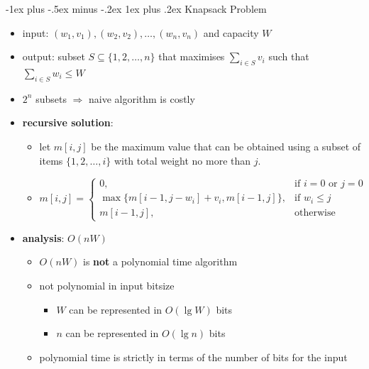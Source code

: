 \documentclass[10pt,landscape]{article}
\makeatletter
\renewcommand{\subsubsection}{\@startsection{subsubsection}{3}{0mm}%
                                {-1ex plus -.5ex minus -.2ex}%
                                {1ex plus .2ex}%
                                {\normalfont\small\bfseries}}
\newcommand{\1}{\mathmybb{1}}
\makeatother
\begin{document}
\begin{multicols*}{3}
\subsubsection{Knapsack Problem}
\begin{itemize}[topsep=0pt,noitemsep,wide=0pt, leftmargin=\dimexpr{} + 2\relax]
  \item input: $(w_1, v_1), (w_2, v_2), \dots, (w_n, v_n) $ and capacity $W$
  \item output: subset $S \subseteq \{ 1, 2, \dots, n \}$ that maximises $\sum_{i \in S}v_i$ such that $\sum_{i \in S} w_i \leq W$
\end{itemize}

\begin{itemize}[topsep=0pt,noitemsep,wide=0pt, leftmargin=\dimexpr{} + 2\relax]
  \item $2^n$ subsets $\Rightarrow$ naive algorithm is costly 
  \item \textbf{recursive solution}:
    \begin{itemize}[topsep=0pt,noitemsep,wide=0pt, leftmargin=\dimexpr{} + 2\relax]
      \item let $m[i, j]$ be the maximum value that can be obtained using a subset of items $\{1, 2, \dots, i\}$ 
        with total weight no more than $j$.
      \item $m[i, j] = \begin{cases} 0, & \text{if $i=0$ or $j=0$} \\ \max\{ {\scriptstyle m[i-1, j-w_i] + v_i, m[i-1, j] }\}, & \text{if $w_i \leq j$} \\ m[i-1, j], & \text{otherwise} \end{cases} $
    \end{itemize}
  \item \textbf{analysis}: $O(nW)$
    \begin{itemize}[topsep=0pt,noitemsep,wide=0pt, leftmargin=\dimexpr{} + 2\relax]
      \item $O(nW)$ is \textbf{not} a polynomial time algorithm
      \item not polynomial in input bitsize 
        \begin{itemize}[topsep=0pt,noitemsep,wide=0pt, leftmargin=\dimexpr{} + 2\relax]
          \item $W$ can be represented in $O(\lg W)$ bits
          \item $n$ can be represented in $O(\lg n)$ bits
        \end{itemize}
      \item polynomial time is strictly in terms of the number of bits for the input
    \end{itemize}
\end{itemize}


\end{multicols*}
\end{document}
